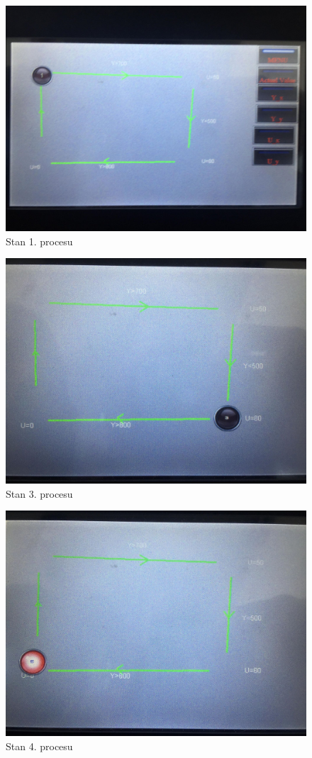 \begin{figure}[H]
    \label{automat_1}
    \centering
    \includegraphics[scale=0.15]{./sections/inteco/images/automat1.jpg}
    \caption{Stan 1. procesu}
\end{figure}

\begin{figure}[H]
    \label{automat_3}
    \centering
    \includegraphics[scale=0.15]{./sections/inteco/images/automat3.jpg}
    \caption{Stan 3. procesu}
\end{figure}

\begin{figure}[H]
    \label{automat_4}
    \centering
    \includegraphics[scale=0.15]{./sections/inteco/images/automat5.jpg}
    \caption{Stan 4. procesu}
\end{figure}


